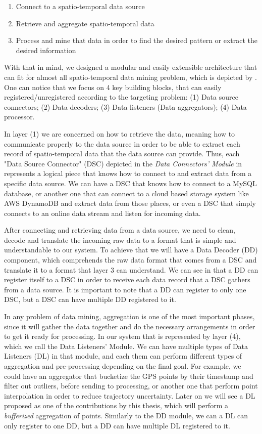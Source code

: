 \begin{enumerate}
    \item Connect to a spatio-temporal data source
    \item Retrieve and aggregate spatio-temporal data
    \item Process and mine that data in order to find the desired pattern or extract the desired information
\end{enumerate}

With that in mind, we designed a modular and easily extensible architecture that can fit for almost all spatio-temporal
data mining problem, which is depicted by . One can notice that we focus on 4 key building
blocks, that can easily registered/unregistered according to the targeting problem: (1) Data source connectors; (2)
Data decoders; (3) Data listeners (Data aggregators); (4) Data processor.

In layer (1) we are concerned on how to retrieve the data, meaning how to communicate properly to the data source in
order to be able to extract each record of spatio-temporal data that the data source can provide. Thus, each "Data
Source Connector" (DSC) depicted in the \textit{Data Connectors' Module} in  represents a
logical piece that knows how to connect to and extract data from a specific data source. We can have a DSC that knows
how to connect to a MySQL database, or another one that can connect to a cloud based storage system like AWS DynamoDB
and extract data from those places, or even a DSC that simply connects to an online data stream and listen for incoming
data.

After connecting and retrieving data from a data source, we need to clean, decode and translate the incoming raw data to
a format that is simple and understandable to our system. To achieve that we will have a Data Decoder (DD) component,
which comprehends the raw data format that comes from a DSC and translate it to a format that layer 3 can understand. We
can see in  that a DD can register itself to a DSC in order to receive each data record that a
DSC gathers from a data source. It is important to note that a DD can register to only one DSC, but a DSC can have
multiple DD registered to it.

In any problem of data mining, aggregation is one of the most important phases, since it will gather the data together
and do the necessary arrangements in order to get it ready for processing. In our system that is represented by layer
(4), which we call the Data Listeners' Module. We can have multiple types of Data Listeners (DL) in that module, and
each them can perform different types of aggregation and pre-processing depending on the final goal. For example, we
could have an aggregator that bucketize the GPS points by their timestamp and filter out outliers, before sending to
processing, or another one that perform point interpolation in order to reduce trajectory uncertainty. Later on we will
see a DL proposed as one of the contributions by this thesis, which will perform a \textit{bufferized} aggregation of
points. Similarly to the DD module, we can a DL can only register to one DD, but a DD can have multiple DL registered to
it.

